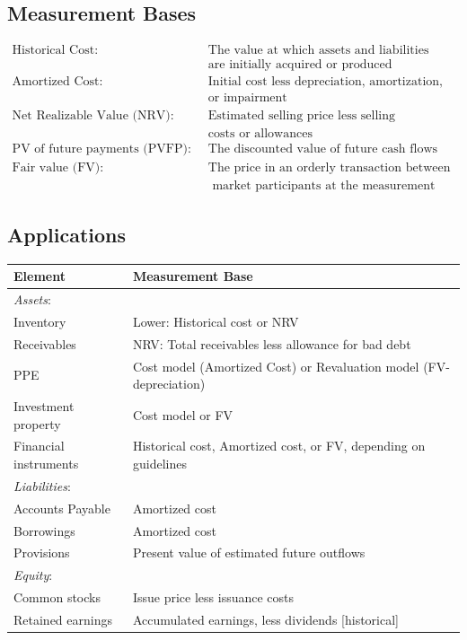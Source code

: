 \documentclass[12pt]{article}
\begin{document}
\subsection{Measurement Bases}
\begin{tcolorbox}
	\begin{align*}
	\text{Historical Cost:}\quad & \text{The value at which assets and liabilities} \\
	\quad & \text{are initially acquired or produced} \\
	\text{Amortized Cost:} \quad & \text{Initial cost less depreciation, amortization,} \\
	\quad & \text{or impairment} \\
	\text{Net Realizable Value (NRV):} \quad & \text{Estimated selling price less selling } \\
	\quad & \text{costs or allowances} \\
	\text{PV of future payments (PVFP):} \quad & \text{The discounted value of future cash flows} \\
	\text{Fair value (FV):} \quad & \text{The price in an orderly transaction between} \\
	\quad & \text{ market participants at the measurement date}
\end{align*}
\end{tcolorbox}

\subsection{Applications}
\begin{tcolorbox}
\begin{tabularx}{\textwidth}{|l|X|}
	\hline
	\textbf{Element} & \textbf{Measurement Base} \\
	\hline
	\textit{Assets}: & \\
	Inventory & Lower: Historical cost or NRV \\
	Receivables &  NRV: Total receivables less allowance for bad debt\\
	PPE & Cost model (Amortized Cost) or Revaluation model (FV- depreciation) \\
	Investment property & Cost model or FV \\
	Financial instruments & Historical cost, Amortized cost, or FV, depending on guidelines \\
	\hline
	\textit{Liabilities}: & \\
	Accounts Payable & Amortized cost \\	
	Borrowings & Amortized cost \\
	Provisions & Present value of estimated future outflows \\
	\hline
	\textit{Equity}: & \\
	Common stocks & Issue price less issuance costs \\
	Retained earnings & Accumulated earnings, less dividends [historical]\\
	\hline
\end{tabularx}
\end{tcolorbox}	
\end{document}
